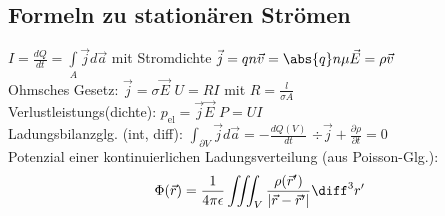 \subsection{Formeln zu stationären Strömen}
$I = \frac{d Q}{d t} = \int \limits_A \vec j d \vec a$ mit Stromdichte $\vec j = qn\vec v = \abs{q}n\mu \vec E=\rho\vec v$ \\
Ohmsches Gesetz: $\vec j = \sigma\vec E$ \quad $U = R I$ mit $R = \frac{l}{\sigma A}$ \\
Verlustleistungs(dichte): $p_{\text{el}} = \vec j \vec E$ \quad $P = UI$ \\
Ladungsbilanzglg. (int, diff): $\int_{\partial V} \vec j d \vec a  = - \frac{d Q(V)}{dt}$ \quad $\div \vec j + \frac{\partial \rho}{\partial t} = 0$ \\
Potenzial einer kontinuierlichen Ladungsverteilung (aus Poisson-Glg.):
\begin{equation*}
    \Phi(\vec r) = \frac{1}{4\pi\epsilon}\iiint_V \frac{\rho (\vec r ')}{|\vec r - \vec r'|} \diff^3 r'
\end{equation*}